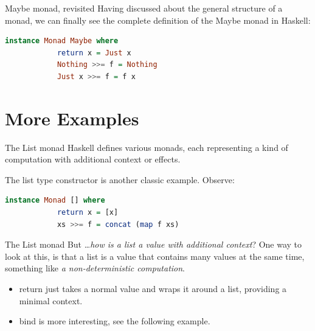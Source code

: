 \documentclass{beamer}
\begin{document}
\begin{frame}[fragile]{Maybe monad, revisited}
    Having discussed about the general structure of a monad, we can
    finally see the complete definition of the Maybe monad in Haskell:

    \begin{minipage}{\linewidth} \hspace{1cm}
    \begin{lstlisting}[language=haskell, numbers=none, frame=none]
          instance Monad Maybe where
            return x = Just x
            Nothing >>= f = Nothing
            Just x >>= f = f x
    \end{lstlisting}
    \end{minipage} \hspace{1cm}
\end{frame}

\section{More Examples}

\begin{frame}[fragile]{The List monad}
    Haskell defines various monads, each representing a kind of
    computation with additional context or effects.

    \bigbreak
    The list type constructor is another classic example. Observe:

    \begin{minipage}{\linewidth} \hspace{1cm}
    \begin{lstlisting}[language=haskell, numbers=none, frame=none]
          instance Monad [] where
            return x = [x]
            xs >>= f = concat (map f xs)
    \end{lstlisting}
    \end{minipage} \hspace{1cm}
\end{frame}

\begin{frame}[fragile]{The List monad}
    But \dots \textit{how is a list a value with additional context}?
    One way to look at this, is that a list is a value that contains
    many values at the same time, something like \textit{a non-deterministic
    computation}.

    \bigbreak
    \begin{itemize}
        \setlength \itemsep{1em}
        \item return just takes a normal value and wraps it around a list,
              providing a minimal context.
        \item bind is more interesting, see the following example.
    \end{itemize}
\end{frame}
\end{document}
